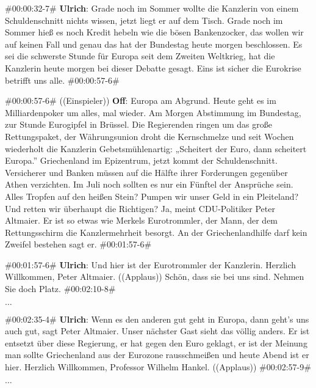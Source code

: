 \begin{description}
	\begin{linenumbers}[1]
		\item \#00:00:32-7\# \textbf{Ulrich}: Grade noch im Sommer wollte die Kanzlerin von einem Schuldenschnitt nichts wissen, jetzt liegt er auf dem Tisch. Grade noch im Sommer hieß es noch Kredit hebeln wie die bösen Bankenzocker, das wollen wir auf keinen Fall und genau das hat der Bundestag heute morgen beschlossen. Es sei die schwerste Stunde für Europa seit dem Zweiten Weltkrieg, hat die Kanzlerin heute morgen bei dieser Debatte gesagt. Eins ist sicher die Eurokrise betrifft uns alle. \#00:00:57-6\#
		
		\item \#00:00:57-6\# ((Einspieler)) \textbf{Off}: Europa am Abgrund. Heute geht es im Milliardenpoker um alles, mal wieder. Am Morgen Abstimmung im Bundestag, zur Stunde Eurogipfel in Brüssel. Die Regierenden ringen um das große Rettungspaket, der Währungsunion droht die Kernschmelze und seit Wochen wiederholt die Kanzlerin Gebetsmühlenartig: „Scheitert der Euro, dann scheitert Europa.” Griechenland im Epizentrum, jetzt kommt der Schuldenschnitt. Versicherer und Banken müssen auf die Hälfte ihrer Forderungen gegenüber Athen verzichten. Im Juli noch sollten es nur ein Fünftel der Ansprüche sein. Alles Tropfen auf den heißen Stein? Pumpen wir unser Geld in ein Pleiteland? Und retten wir überhaupt die Richtigen? Ja, meint CDU-Politiker Peter Altmaier. Er ist so etwas wie Merkels Eurotrommler, der Mann, der dem Rettungsschirm die Kanzlermehrheit besorgt. An der Griechenlandhilfe darf kein Zweifel bestehen sagt er. \#00:01:57-6\#
		
		\item \#00:01:57-6\# \textbf{Ulrich}: Und hier ist der Eurotrommler der Kanzlerin. Herzlich Willkommen, Peter Altmaier. ((Applaus)) Schön, dass sie bei uns sind. Nehmen Sie doch Platz. \#00:02:10-8\#
		
		\item $\ldots$
		
		\#00:02:35-4\# \textbf{Ulrich}: Wenn es den anderen gut geht in Europa, dann geht's uns auch gut, sagt Peter Altmaier. Unser nächster Gast sieht das völlig anders. Er ist entsetzt über diese Regierung, er hat gegen den Euro geklagt, er ist der Meinung man sollte Griechenland aus der Eurozone rausschmeißen und heute Abend ist er hier. Herzlich Willkommen, Professor Wilhelm Hankel. ((Applaus)) \#00:02:57-9\#
		
		\item $\ldots$
		

\end{linenumbers}
\end{description}
